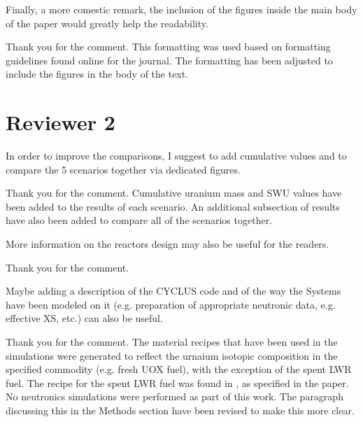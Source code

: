 \documentclass[answers,11pt]{exam}
\begin{document}
\begin{questions}
        \question Finally, a more comestic remark, the inclusion of the figures 
        inside the main body of the paper would greatly help the readability.

        \begin{solution}
        	Thank you for the comment. This formatting was used based on 
                formatting guidelines found online for the journal. The formatting 
                has been adjusted to include the figures in the body of the text. 

        \end{solution}
\end{questions}

\section*{Reviewer 2}
\begin{questions}
        \question In order to improve the comparisons, I suggest to add 
        cumulative values and to compare the 5 scenarios together via dedicated 
        figures.
        \begin{solution}
                Thank you for the comment. Cumulative uranium mass and \gls{SWU} values 
                have been added to the results of each scenario. An additional 
                subsection of results have also been added to compare all of the 
                scenarios together.
        \end{solution}

        \question More information on the reactors design may also be useful 
        for the readers.
        \begin{solution}
                Thank you for the comment. 
        \end{solution}

        \question Maybe adding a description of the CYCLUS code and of the way 
        the Systems have been modeled on it (e.g. preparation of appropriate 
        neutronic data, e.g. effective XS, etc.) can also be useful.
        \begin{solution}
                Thank you for the comment. The material recipes that have been used 
                in the simulations were generated to reflect the urnaium isotopic 
                composition in the specified commodity (e.g. fresh UOX fuel), with 
                the exception of the spent \gls{LWR} fuel. The recipe for the spent 
                \gls{LWR} fuel 
                was found in \cite{yacout_visionverifiable_2006}, as specified in 
                the paper. No neutronics simulations were performed as part of this 
                work. The paragraph discussing this in the Methods section have been 
                revised to make this more clear. 
        \end{solution}

\end{questions}


\end{document}
